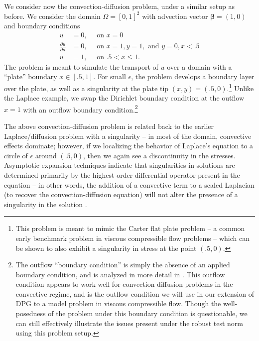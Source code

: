 \documentclass[letterpaper]{article}
\def\bbeta{\boldsymbol\beta}
\newcommand{\pd}[2]{\frac{\partial#1}{\partial#2}}
\begin{document}
We consider now the convection-diffusion problem, under a similar setup as
before.  We consider the domain $\Omega = [0,1]^2$ with advection vector
$\bbeta=(1,0)$ and boundary conditions
\begin{align*}
u &= 0,\quad \text{ on } x = 0\\
\pd{u}{n} &= 0,\quad \text{ on } x = 1, y = 1, \text{ and } y = 0, x < .5\\
u &= 1,\quad \text{ on } .5 < x \leq 1.
\end{align*}
The problem is meant to simulate the transport of $u$ over a domain with a
``plate'' boundary $x \in [.5,1]$.  For small $\epsilon$, the problem develops
a boundary layer over the plate, as well as a singularity at the plate tip
$(x,y) = (.5,0)$.\footnote{This problem is meant to mimic the Carter flat
plate problem -- a common early benchmark problem in viscous compressible flow
problems -- which can be shown to also exhibit a singularity in stress at the
point $(.5,0)$.}  Unlike the Laplace example, we swap the Dirichlet boundary
condition at the outflow $x=1$ with an outflow boundary
condition.\footnote{The outflow ``boundary condition'' is simply the absence
of an applied boundary condition, and is analyzed in more detail in
\cite{FLD:FLD505}.  This outflow condition appears to work well for
convection-diffusion problems in the convective regime, and is the outflow
condition we will use in our extension of DPG to a model problem in viscous
compressible flow.  Though the well-posedness of the problem under this
boundary condition is questionable, we can still effectively illustrate the
issues present under the robust test norm using this problem setup.  }

The above convection-diffusion problem is related back to the earlier
Laplace/diffusion problem with a singularity -- in most of the domain,
convective effects dominate; however, if we  localizing the behavior of
Laplace's equation to a circle of $\epsilon$ around $(.5,0)$, then we again
see a discontinuity in the stresses.  Asymptotic expansion techniques indicate
that singularities in solutions are determined primarily by the highest order
differential operator present in the equation -- in other words, the addition
of a convective term to a scaled Laplacian (to recover the
convection-diffusion equation) will not alter the presence of a singularity in
the solution \cite{roos2008robust}.
\end{document}
